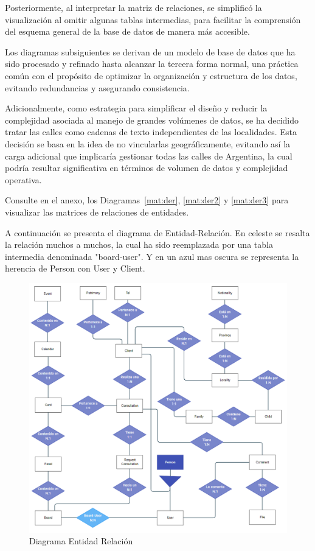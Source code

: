Posteriormente, al interpretar la matriz de relaciones, se simplificó la visualización al omitir algunas tablas intermedias, para facilitar la comprensión del esquema general de la base de datos de manera más accesible.

Los diagramas subsiguientes se derivan de un modelo de base de datos que ha sido procesado y refinado hasta alcanzar la tercera forma normal, una práctica común con el propósito de optimizar la organización y estructura de los datos, evitando redundancias y asegurando consistencia.

Adicionalmente, como estrategia para simplificar el diseño y reducir la complejidad asociada al manejo de grandes volúmenes de datos, se ha decidido tratar las calles como cadenas de texto independientes de las localidades. Esta decisión se basa en la idea de no vincularlas geográficamente, evitando así la carga adicional que implicaría gestionar todas las calles de Argentina, la cual podría resultar significativa en términos de volumen de datos y complejidad operativa.

Consulte en el anexo, los Diagramas~\ref{mat:der}, \ref{mat:der2} y \ref{mat:der3} para visualizar las matrices de relaciones de entidades.



A continuación se presenta el diagrama de Entidad-Relación. En celeste se resalta la relación muchos a muchos, la cual ha sido reemplazada por una tabla intermedia denominada "board-user". Y en un azul mas oscura se representa la herencia de Person con User y Client.

\begin{figure}[H]
    \centering
    \includegraphics[width=1\linewidth]{fig/der.png}
    \caption{Diagrama Entidad Relación}
    \label{fig:der}
\end{figure}

